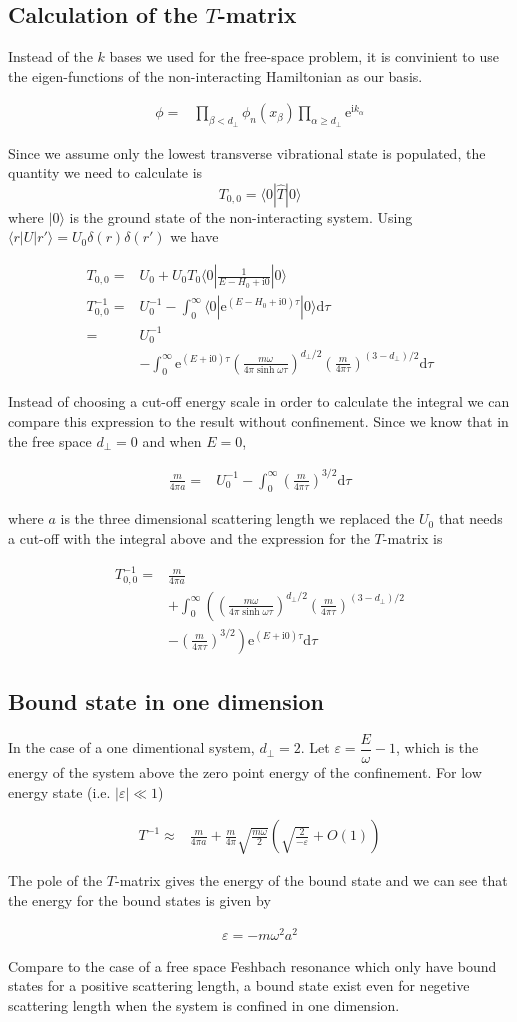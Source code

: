 \documentclass[aps,twocolumn,secnumarabic,balancelastpage,amsmath,amssymb,nofootinbib]{revtex4}
\newcommand{\ud}{\mathrm{d}}
\newcommand{\ue}{\mathrm{e}}
\newcommand{\ui}{\mathrm{i}}
\newcommand{\eqar}[1]
{
  \begin{align*}
    #1
  \end{align*}
}
\newcommand{\paren}[1]{{\left({#1}\right)}}
\newcommand{\lparen}[1]{{\left({#1}\right.}}
\newcommand{\rparen}[1]{{\left.{#1}\right)}}
\newcommand{\abs}[1]{{\left|{#1}\right|}}
\begin{document}
\subsection{Calculation of the $T$-matrix}
Instead of the $k$ bases we used for the free-space problem, it is convinient to use the eigen-functions of the non-interacting Hamiltonian as our basis.
\eqar{
  \phi=&\prod_{\beta<d_\perp}\phi_n\paren{x_\beta}\prod_{\alpha\geqslant d_\perp}\ue^{\ui k_\alpha}
}
Since we assume only the lowest transverse vibrational state is populated, the quantity we need to calculate is
\[T_{0,0}=\langle0|\hat T|0\rangle\]
where $|0\rangle$ is the ground state of the non-interacting system. Using $\langle r|U|r'\rangle=U_0\delta\paren{r}\delta\paren{r'}$ we have
\eqar{
  T_{0,0}=&U_0+U_0T_0\langle0|\frac{1}{E-H_0+\ui0}|0\rangle\\
  T_{0,0}^{-1}=&U_0^{-1}-\int_0^\infty\langle0|\ue^{\paren{E-H_0+\ui0}\tau}|0\rangle\ud\tau\\
  =&U_0^{-1}\\
  &-\int_0^\infty\ue^{\paren{E+\ui0}\tau}\paren{\frac{m\omega}{4\pi\sinh\omega\tau}}^{d_\perp/2}\paren{\frac{m}{4\pi\tau}}^{\paren{3-d_\perp}/2}\ud\tau
}
Instead of choosing a cut-off energy scale in order to calculate the integral we can compare this expression to the result without confinement. Since we know that in the free space $d_\perp=0$ and when $E=0$,
\eqar{
  \frac{m}{4\pi a}=&U_0^{-1}-\int_0^\infty\paren{\frac{m}{4\pi\tau}}^{3/2}\ud\tau
}
where $a$ is the three dimensional scattering length we replaced the $U_0$ that needs a cut-off with the integral above and the expression for the $T$-matrix is
\eqar{
  T_{0,0}^{-1}=&\frac{m}{4\pi a}\\
  &+\int_{0}^{\infty}\lparen{\paren{\frac{m\omega}{4\pi\sinh\omega\tau}}^{d_\perp/2}\paren{\frac{m}{4\pi\tau}}^{\paren{3-d_\perp}/2}}\\
  &\rparen{-\paren{\frac{m}{4\pi\tau}}^{3/2}}\ue^{\paren{E+\ui0}\tau}\ud\tau
}

\subsection{Bound state in one dimension}
In the case of a one dimentional system, $d_\perp=2$. Let $\varepsilon=\dfrac{E}{\omega}-1$, which is the energy of the system above the zero point energy of the confinement. For low energy state (i.e. $\abs{\varepsilon}\ll1$)
\eqar{
  T^{-1}\approx&\frac{m}{4\pi a}+\frac{m}{4\pi}\sqrt{\frac{m\omega}{2}}\paren{\sqrt{\frac{2}{-\varepsilon}}+O\paren{1}}
}
The pole of the $T$-matrix gives the energy of the bound state and we can see that the energy for the bound states is given by
\eqar{
  \varepsilon=-m\omega^2a^2
}
Compare to the case of a free space Feshbach resonance which only have bound states for a positive scattering length, a bound state exist even for negetive scattering length when the system is confined in one dimension.
\end{document}

